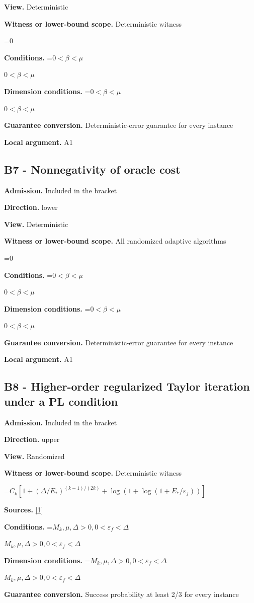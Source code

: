 \documentclass[10pt,a4paper]{article}
\newcommand{\AtlasMath}[1]{\par\begingroup\centering\setbox0=\hbox{$\displaystyle #1$}\ifdim\wd0>1.4\linewidth\typeout{ATLAS WIDE FORMULA: \the\wd0}\fi\ifdim\wd0>\linewidth\resizebox{\linewidth}{!}{\box0}\else\box0\fi\par\endgroup}
\newcommand{\AtlasInlineMath}[1]{\begingroup\setbox0=\hbox{$#1$}\ifdim\wd0>.4\linewidth\endgroup\AtlasMath{#1}\else\endgroup$#1$\fi}
\begin{document}
\textbf{View.} Deterministic

\textbf{Witness or lower-bound scope.} Deterministic witness

\AtlasMath{0}
\textbf{Conditions.} \AtlasInlineMath{0<\beta<\mu}

\textbf{Dimension conditions.} \AtlasInlineMath{0<\beta<\mu}

\textbf{Guarantee conversion.} Deterministic-error guarantee for every instance

\textbf{Local argument.} A1

\subsection{B7 - Nonnegativity of oracle cost}
\textbf{Admission.} Included in the bracket

\textbf{Direction.} lower

\textbf{View.} Deterministic

\textbf{Witness or lower-bound scope.} All randomized adaptive algorithms

\AtlasMath{0}
\textbf{Conditions.} \AtlasInlineMath{0<\beta<\mu}

\textbf{Dimension conditions.} \AtlasInlineMath{0<\beta<\mu}

\textbf{Guarantee conversion.} Deterministic-error guarantee for every instance

\textbf{Local argument.} A1

\subsection{B8 - Higher-order regularized Taylor iteration under a PL condition}
\textbf{Admission.} Included in the bracket

\textbf{Direction.} upper

\textbf{View.} Randomized

\textbf{Witness or lower-bound scope.} Deterministic witness

\AtlasMath{C_k[1+(\Delta/E_*)^{(k-1)/(2k)}+\log(1+\log(1+E_*/\varepsilon_f))]}
\textbf{Sources.} \href{https://optimization-online.org/wp-content/uploads/2015/06/4970.pdf}{[1]}

\textbf{Conditions.} \AtlasInlineMath{M_k,\mu,\Delta>0,0<\varepsilon_f<\Delta}

\textbf{Dimension conditions.} \AtlasInlineMath{M_k,\mu,\Delta>0,0<\varepsilon_f<\Delta}

\textbf{Guarantee conversion.} Success probability at least 2/3 for every instance
\end{document}
